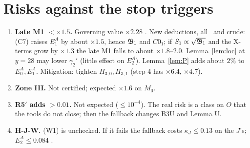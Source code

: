 \documentclass[11pt]{article}
\theoremstyle{definition}\newtheorem{definition}[theorem]{Definition}
\theoremstyle{remark}\newtheorem{remark}[theorem]{Remark}
\begin{document}
\section{Risks against the stop triggers}\label{sec:risk}
\begin{enumerate}[leftmargin=*,itemsep=2pt]
\item \textbf{Late M1 $<\times1.5$.} Governing value $\times2.28$ \tR. New deductions, all \tE\ and crude: (C7) raises $E_1^A$ by about $\times1.5$, hence $\mathfrak B_1$ and $C0_1$; if $S_1\propto\sqrt{\mathfrak B_1}$ and the X-terms grow by $\times1.3$ the late M1 falls to about $\times1.8$--$2.0$. Lemma~\ref{lem:loc} at $y=28$ may lower $\gamma_2'$ (little effect on $E_2^A$). Lemma~\ref{lem:P} adds about $2\%$ to $E_0^A,E_1^A$. Mitigation: tighten $H_{3,0},H_{3,1}$ (step 4 has $\times6.4$, $\times4.7$).
\item \textbf{Zone III.} Not certified; expected $\times1.6$ on $M_0$.
\item \textbf{R5$'$ adds $>0.01$.} Not expected ($\le10^{-4}$). The real risk is a class on $O$ that the tools do not close; then the fallback changes B3U and Lemma U.
\item \textbf{H-J-W.} (W1) is unchecked. If it fails the fallback costs $\kappa_J\le0.13$ on the $J$'s; $E_2^A\le0.084$ \tE.
\end{enumerate}
\end{document}
